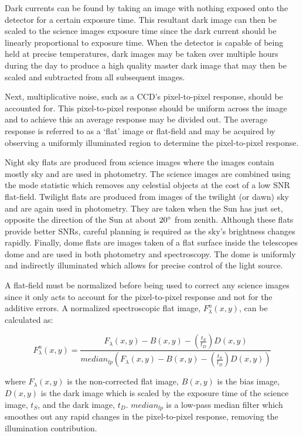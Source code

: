 Dark currents can be found by taking an image with nothing exposed onto the detector for a certain exposure time. This resultant dark image can then be scaled to the science images exposure time since the dark current should be linearly proportional to exposure time. When the detector is capable of being held at precise temperatures, dark images may be taken over multiple hours during the day to produce a high quality master dark image that may then be scaled and subtracted from all subsequent images.
\prgph

Next, multiplicative noise, such as a \gls{CCD}'s pixel-to-pixel response, should be accounted for. This pixel-to-pixel response should be uniform across the image and to achieve this an average response may be divided out. The average response is referred to as a `flat' image or flat-field and may be acquired by observing a uniformly illuminated region to determine the pixel-to-pixel response.
\prgph

Night sky flats are produced from science images where the images contain mostly sky and are used in photometry. The science images are combined using the mode statistic which removes any celestial objects at the cost of a low \gls{SNR} flat-field.
Twilight flats are produced from images of the twilight (or dawn) sky and are again used in photometry. They are taken when the Sun has just set, opposite the direction of the Sun at about $20\hbox{$^\circ$}$ from zenith. Although these flats provide better \glspl{SNR}, careful planning is required as the sky's brightness changes rapidly.
Finally, dome flats are images taken of a flat surface inside the telescopes dome and are used in both photometry and spectroscopy. The dome is uniformly and indirectly illuminated which allows for precise control of the light source.
\prgph

A flat-field must be normalized before being used to correct any science images since it only acts to account for the pixel-to-pixel response and not for the additive errors. A  normalized spectroscopic flat image, $F^{n}_{\lambda}(x,y)$, can be calculated as:

\begin{equation}
    F^{n}_{\lambda}(x,y) = \frac{F_{\lambda}(x,y) - B(x,y) - (\frac{t_{S}}{t_{D}})D(x,y)}{median_{lp}(F_{\lambda}(x,y) - B(x,y) - (\frac{t_{S}}{t_{D}})D(x,y))}
    \label{eq:norm_flat}
\end{equation}

\noindent where $F_{\lambda}(x,y)$ is the non-corrected flat image, $B(x,y)$ is the bias image, $D(x,y)$ is the dark image which is scaled by the exposure time of the science image, $t_{S}$, and the dark image, $t_{D}$. $median_{lp}$ is a low-pass median filter which smoothes out any rapid changes in the pixel-to-pixel response, removing the illumination contribution.
\prgph

